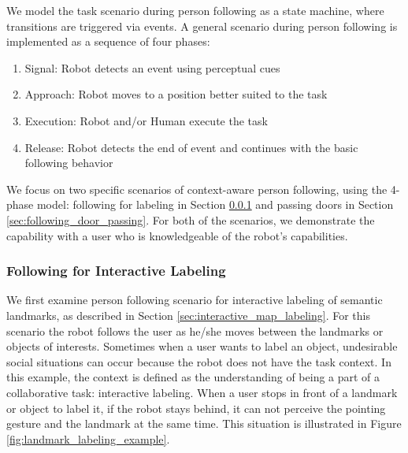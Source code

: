 \documentclass[3p]{elsarticle}
\begin{document}
We model the task scenario during person following as a state machine, where transitions are triggered via events. A general scenario during person following is implemented as a sequence of four phases:

\begin{enumerate}
\item Signal: Robot detects an event using perceptual cues
\item Approach: Robot moves to a position better suited to the task
\item Execution: Robot and/or Human execute the task
\item Release: Robot detects the end of event and continues with the basic following behavior
\end{enumerate}

We focus on two specific scenarios of context-aware person following, using the 4-phase model: following for labeling in Section \ref{sec:following_for labeling} and passing doors in Section \ref{sec:following_door_passing}. For both of the scenarios, we demonstrate the capability with a user who is knowledgeable of the robot's capabilities.

\subsubsection{Following for Interactive Labeling}
\label{sec:following_for labeling}

We first examine person following scenario for interactive labeling of semantic landmarks, as described in Section \ref{sec:interactive_map_labeling}. For this scenario the robot follows the user as he/she moves between the landmarks or objects of interests. Sometimes when a user wants to label an object, undesirable social situations can occur because the robot does not have the task context. In this example, the context is defined as the understanding of being a part of a collaborative task: interactive labeling. When a user stops in front of a landmark or object to label it, if the robot stays behind, it can not perceive the pointing gesture and the landmark at the same time. This situation is illustrated in Figure \ref{fig:landmark_labeling_example}. 
\end{document}
